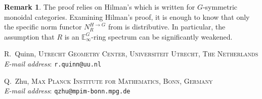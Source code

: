 \documentclass[a4paper, 10pt]{article}
\makeatletter
\newcommand{\Addresses}{{
  \bigskip
  \footnotesize

  R.~Quinn, \textsc{Utrecht Geometry Center, Universiteit Utrecht, The Netherlands}\\ \nopagebreak
  \textit{E-mail address}: \texttt{r.quinn@uu.nl}


  Q.~Zhu, \textsc{Max Planck Institute for Mathematics, Bonn, Germany}\\ \nopagebreak
  \textit{E-mail address}: \texttt{qzhu@mpim-bonn.mpg.de}

}}
\newcommand{\E}{\mathbb E}  %
\theoremstyle{definition}
\newtheorem{remark}[remark]{Remark}
\makeatother
\begin{document}
\begin{remark}
    The proof relies on Hilman's \cite[Proposition 3.2.8]{hilman2024parametrisednoncommutativemotivesequivariant} which is written for \(G\)-symmetric monoidal categories.
    Examining Hilman's proof, it is enough to know that only the specific norm functor \(N^{H\to G}_{R}\) from \cite[Theorem A]{quinnZhu2026multiplicativeequivariantthomspectra} is distributive. In particular, the assumption that \(R\) is an \(\E^G_\infty\)-ring spectrum can be significantly weakened. 
\end{remark}




\Addresses
\end{document}
